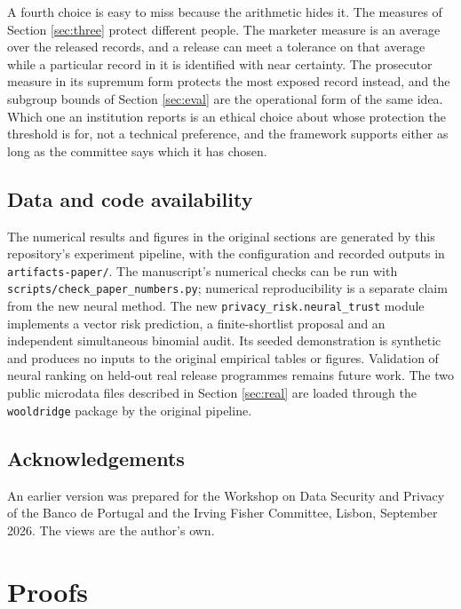 \documentclass[11pt,a4paper]{article}
\theoremstyle{plain}
\theoremstyle{definition}
\begin{document}
A fourth choice is easy to miss because the arithmetic hides it. The measures of
Section \ref{sec:three} protect different people. The marketer measure is an
average over the released records, and a release can meet a tolerance on that
average while a particular record in it is identified with near certainty. The
prosecutor measure in its supremum form protects the most exposed record instead,
and the subgroup bounds of Section \ref{sec:eval} are the operational form of
the same idea. Which one an institution reports is an ethical choice about whose
protection the threshold is for, not a technical preference, and the framework
supports either as long as the committee says which it has chosen.

\subsection*{Data and code availability}

The numerical results and figures in the original sections are generated by
this repository's experiment pipeline, with the configuration and recorded
outputs in \texttt{artifacts-paper/}. The manuscript's numerical checks can be
run with \texttt{scripts/check\_paper\_numbers.py}; numerical reproducibility
is a separate claim from the new neural method. The new
\texttt{privacy\_risk.neural\_trust} module implements a vector risk
prediction, a finite-shortlist proposal and an independent simultaneous
binomial audit. Its seeded demonstration is synthetic and produces no inputs
to the original empirical tables or figures. Validation of neural ranking on
held-out real release programmes remains future work. The two public microdata
files described in Section \ref{sec:real} are loaded through the
\texttt{wooldridge} package by the original pipeline.

\subsection*{Acknowledgements}

An earlier version was prepared for the Workshop on Data Security and Privacy of
the Banco de Portugal and the Irving Fisher Committee, Lisbon, September 2026.
The views are the author's own.

\appendix

\section{Proofs}\label{app:proofs}
\end{document}
